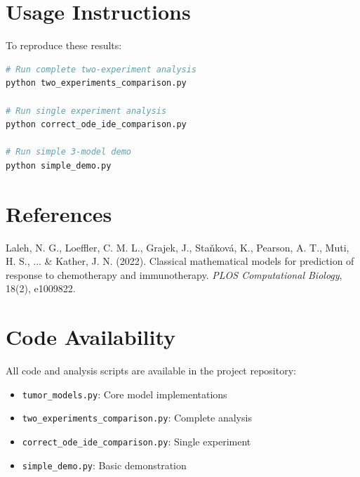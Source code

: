 \documentclass[11pt]{article}
\begin{document}
\section{Usage Instructions}

To reproduce these results:

\begin{lstlisting}[language=bash]
# Run complete two-experiment analysis
python two_experiments_comparison.py

# Run single experiment analysis
python correct_ode_ide_comparison.py

# Run simple 3-model demo
python simple_demo.py
\end{lstlisting}

\section{References}

Laleh, N. G., Loeffler, C. M. L., Grajek, J., Staňková, K., Pearson, A. T., Muti, H. S., ... \& Kather, J. N. (2022). Classical mathematical models for prediction of response to chemotherapy and immunotherapy. \textit{PLOS Computational Biology}, 18(2), e1009822.

\section{Code Availability}

All code and analysis scripts are available in the project repository:
\begin{itemize}
    \item \texttt{tumor\_models.py}: Core model implementations
    \item \texttt{two\_experiments\_comparison.py}: Complete analysis
    \item \texttt{correct\_ode\_ide\_comparison.py}: Single experiment
    \item \texttt{simple\_demo.py}: Basic demonstration
\end{itemize}
\end{document}
